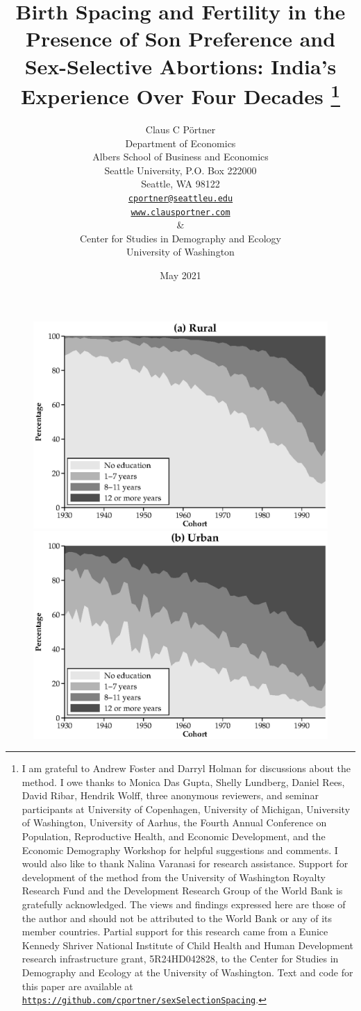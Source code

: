 \documentclass[12pt,letterpaper]{article}
\title{Birth Spacing and Fertility in the Presence of Son Preference and Sex-Selective Abortions:
India's Experience Over Four Decades%
\protect\thanks{%
I am grateful to Andrew Foster and Darryl Holman for discussions about the method.
I owe thanks to Monica Das Gupta, Shelly Lundberg, Daniel Rees, David Ribar, 
Hendrik Wolff, three anonymous reviewers, and seminar participants at University of 
Copenhagen, University of Michigan, University of Washington, University of Aarhus, the 
Fourth Annual Conference on Population, Reproductive Health, 
and Economic Development, and the Economic Demography Workshop for helpful 
suggestions and comments.
I would also like to thank Nalina Varanasi for research assistance.
Support for development of the method from the University of Washington Royalty 
Research Fund and the Development Research Group of the World Bank is gratefully 
acknowledged.
The views and findings expressed here are those of the author and
should not be attributed to the World Bank or any of its member countries.
Partial support for this research came from a Eunice Kennedy Shriver National
Institute of Child Health and Human Development research infrastructure grant,
5R24HD042828, to the Center for Studies in Demography and Ecology at the
University of Washington.
Text and code for this paper are available at 
\href{https://github.com/cportner/sexSelectionSpacing}{\texttt{https://github.com/cportner/sexSelectionSpacing}}.
}
}
\author{Claus C P\"ortner\\
    Department of Economics\\
    Albers School of Business and Economics\\
    Seattle University, P.O. Box 222000\\
    Seattle, WA 98122\\
    \href{mailto:cportner@seattleu.edu}{\texttt{cportner@seattleu.edu}}\\
    \href{http://www.clausportner.com}{\texttt{www.clausportner.com}}\\
    \& \\
    Center for Studies in Demography and Ecology \\
    University of Washington\\ \vspace{2cm}
    }
\date{May 2021}
\begin{document}
\graphicspath{{./figures/}}

\setcounter{page}{-1}
\maketitle
\thispagestyle{empty}

\newpage
\thispagestyle{empty}
\doublespacing


\newpage




\begin{figure}[htpb]
\centering
    \begin{minipage}{0.49\textwidth}
        \includegraphics[width=\textwidth]{educ_over_time_rural}
    \end{minipage}
    \begin{minipage}{0.49\textwidth}
        \includegraphics[width=\textwidth]{educ_over_time_urban} 
    \end{minipage}
\end{figure}
\end{document}
